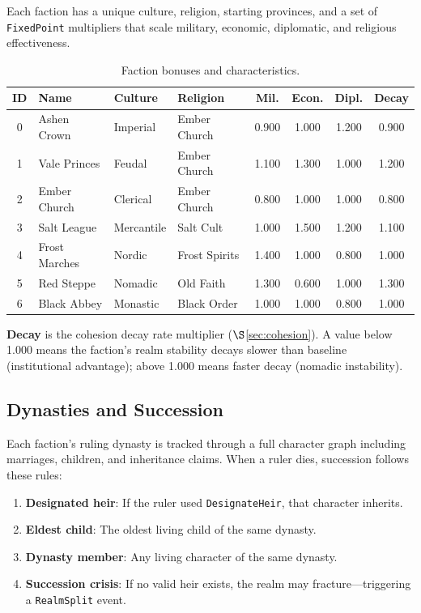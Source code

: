 \documentclass[a4paper, 11pt]{article}
\newcommand{\fp}{\texttt{FixedPoint}}
\begin{document}
Each faction has a unique culture, religion, starting provinces, and a set of
\fp{} multipliers that scale military, economic, diplomatic, and religious
effectiveness.

\begin{table}[htbp]
\centering
\caption{Faction bonuses and characteristics.}
\label{tab:factions}
\small
\begin{tabular}{@{}clllcccc@{}}
\toprule
\textbf{ID} & \textbf{Name} & \textbf{Culture} & \textbf{Religion} &
  \textbf{Mil.} & \textbf{Econ.} & \textbf{Dipl.} & \textbf{Decay} \\
\midrule
0 & Ashen Crown   & Imperial   & Ember Church  & 0.900 & 1.000 & 1.200 & 0.900 \\
1 & Vale Princes  & Feudal     & Ember Church  & 1.100 & 1.300 & 1.000 & 1.200 \\
2 & Ember Church  & Clerical   & Ember Church  & 0.800 & 1.000 & 1.000 & 0.800 \\
3 & Salt League   & Mercantile & Salt Cult     & 1.000 & 1.500 & 1.200 & 1.100 \\
4 & Frost Marches & Nordic     & Frost Spirits & 1.400 & 1.000 & 0.800 & 1.000 \\
5 & Red Steppe    & Nomadic    & Old Faith     & 1.300 & 0.600 & 1.000 & 1.300 \\
6 & Black Abbey   & Monastic   & Black Order   & 1.000 & 1.000 & 0.800 & 1.000 \\
\bottomrule
\end{tabular}
\end{table}

\textbf{Decay} is the cohesion decay rate multiplier ($\S$\ref{sec:cohesion}).
A value below 1.000 means the faction's realm stability decays slower than
baseline (institutional advantage); above 1.000 means faster decay (nomadic
instability).

\subsection{Dynasties and Succession}

Each faction's ruling dynasty is tracked through a full character graph
including marriages, children, and inheritance claims. When a ruler dies,
succession follows these rules:

\begin{enumerate}
  \item \textbf{Designated heir}: If the ruler used \texttt{DesignateHeir},
    that character inherits.
  \item \textbf{Eldest child}: The oldest living child of the same dynasty.
  \item \textbf{Dynasty member}: Any living character of the same dynasty.
  \item \textbf{Succession crisis}: If no valid heir exists, the realm may
    fracture---triggering a \texttt{RealmSplit} event.
\end{enumerate}
\end{document}
